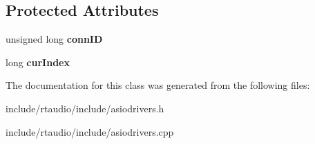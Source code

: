 \subsection*{Protected Attributes}
\begin{DoxyCompactItemize}
\item 
unsigned long {\bfseries conn\+ID}\hypertarget{class_asio_drivers_a1ad87d4a9dbbf89c40b29ce741f69947}{}\label{class_asio_drivers_a1ad87d4a9dbbf89c40b29ce741f69947}

\item 
long {\bfseries cur\+Index}\hypertarget{class_asio_drivers_ad4da7680fc03d7ebdf944ce9f32f95d5}{}\label{class_asio_drivers_ad4da7680fc03d7ebdf944ce9f32f95d5}

\end{DoxyCompactItemize}


The documentation for this class was generated from the following files\+:\begin{DoxyCompactItemize}
\item 
include/rtaudio/include/asiodrivers.\+h\item 
include/rtaudio/include/asiodrivers.\+cpp\end{DoxyCompactItemize}
